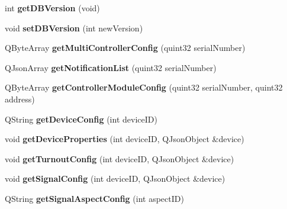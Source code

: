 \begin{DoxyCompactItemize}
\item 
\mbox{\label{class_database_a40123ea0706f6bd80a66f4c03026aaae}} 
int {\bfseries get\+D\+B\+Version} (void)
\item 
\mbox{\label{class_database_ac661c2459b9a7ac22c882971be8ee3b8}} 
void {\bfseries set\+D\+B\+Version} (int new\+Version)
\item 
\mbox{\label{class_database_ae92b8bfa260ee01d7e2bb411917f3049}} 
Q\+Byte\+Array {\bfseries get\+Multi\+Controller\+Config} (quint32 serial\+Number)
\item 
\mbox{\label{class_database_aa458cd303347f4f10b74c2c9b3661084}} 
Q\+Json\+Array {\bfseries get\+Notification\+List} (quint32 serial\+Number)
\item 
\mbox{\label{class_database_aaabd22c307d3bdb68148296d636758cf}} 
Q\+Byte\+Array {\bfseries get\+Controller\+Module\+Config} (quint32 serial\+Number, quint32 address)
\item 
\mbox{\label{class_database_a702c94a5d8c9796ad5e4e216ae9278fa}} 
Q\+String {\bfseries get\+Device\+Config} (int device\+ID)
\item 
\mbox{\label{class_database_a26943586c348a996d31c722cd10c8bc2}} 
void {\bfseries get\+Device\+Properties} (int device\+ID, Q\+Json\+Object \&device)
\item 
\mbox{\label{class_database_a26992f37246c3c2383716704398c3403}} 
void {\bfseries get\+Turnout\+Config} (int device\+ID, Q\+Json\+Object \&device)
\item 
\mbox{\label{class_database_a14e593519bd9fe8c414083d633906786}} 
void {\bfseries get\+Signal\+Config} (int device\+ID, Q\+Json\+Object \&device)
\item 
\mbox{\label{class_database_a13557f1cf9e0ea0b12d73652686dcee5}} 
Q\+String {\bfseries get\+Signal\+Aspect\+Config} (int aspect\+ID)
\item 
\mbox{\label{class_database_a015c1d3e3c83c9c66fe4f86dbff656a6}} 

\end{DoxyCompactItemize}
